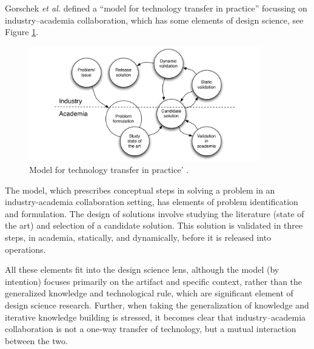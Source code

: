\documentclass[graybox]{svmult}
\begin{document}
Gorschek \emph{et al.} defined a ``model for technology transfer in practice'' \cite{GorschekSW2006} focussing on industry--academia collaboration, which has some elements of design science, see Figure \ref{fig:GorschekModel}.

\begin{figure}
  \includegraphics[width=0.9\textwidth]{Figures/GorschekModel.pdf}
\caption{Model for technology transfer in practice' \cite{GorschekSW2006}.}
\label{fig:GorschekModel}       %
\end{figure}

The model, which prescribes conceptual steps in solving a problem in an industry-academia collaboration setting, has elements of problem identification and formulation. The design of solutions involve studying the literature (state of the art) and selection of a candidate solution. This solution is validated in three steps, in academia, statically, and dynamically, before it is released into operations. 

All these elements fit into the design science lens, although the model (by intention) focuses primarily on the artifact and specific context, rather than the generalized knowledge and technological rule, which are significant element of design science research. Further, when taking the generalization of knowledge and iterative knowledge building is stressed, it becomes clear that industry--academia collaboration is not a one-way transfer of technology, but a mutual interaction between the two.
\end{document}
